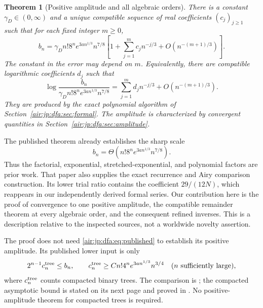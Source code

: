 \documentclass[11pt,letterpaper]{article}
\numberwithin{equation}{section}
\newtheorem{theorem}{Theorem}[section]
\theoremstyle{remark}
\begin{document}
\begin{theorem}[Positive amplitude and all algebraic orders]\label{air:jp:dfa:thm:main}
There is a constant $\gamma_D\in(0,\infty)$ and a unique compatible sequence of real coefficients $(c_j)_{j\ge1}$ such that for each fixed integer $m\ge0$,
\begin{equation}\label{air:jp:dfa:eq:main}
 b_n=\gamma_D n!8^ne^{3an^{1/3}}n^{7/8}
 \left[1+\sum_{j=1}^{m}c_jn^{-j/3}+O(n^{-(m+1)/3})\right].
\end{equation}
The constant in the error may depend on $m$. Equivalently, there are compatible logarithmic coefficients $d_j$ such that
\begin{equation}\label{air:jp:dfa:eq:logmain}
 \log\frac{b_n}{\gamma_D n!8^ne^{3an^{1/3}}n^{7/8}}
 =\sum_{j=1}^{m}d_jn^{-j/3}+O(n^{-(m+1)/3}).
\end{equation}
They are produced by the exact polynomial algorithm of Section~\ref{air:jp:dfa:sec:formal}. The amplitude is characterized by convergent quantities in Section~\ref{air:jp:dfa:sec:amplitude}.
\end{theorem}

The published theorem \cite[Theorem 1]{dfa} already establishes the sharp scale
\begin{equation}\label{air:jp:dfa:eq:published}
 b_n=\Theta\!\left(n!8^ne^{3an^{1/3}}n^{7/8}\right).
\end{equation}
Thus the factorial, exponential, stretched-exponential, and polynomial factors are prior work. That paper also supplies the exact recurrence and Airy comparison construction. Its lower trial ratio contains the coefficient $29/(12N)$, which reappears in our independently derived formal series. Our contribution here is the proof of convergence to one positive amplitude, the compatible remainder theorem at every algebraic order, and the consequent refined inverses. This is a description relative to the inspected sources, not a worldwide novelty assertion.

The proof does not need \eqref{air:jp:dfa:eq:published} to establish its positive amplitude. Its published lower input is only
\begin{equation}\label{air:jp:dfa:eq:compactedlower}
 2^{n-1}c_n^{\rm tree}\le b_n,\qquad
 c_n^{\rm tree}\ge C n!4^ne^{3an^{1/3}}n^{3/4}
 \quad(n\text{ sufficiently large}),
\end{equation}
where $c_n^{\rm tree}$ counts compacted binary trees. The comparison is \cite[Equation (1)]{dfa}; the compacted asymptotic bound is stated on its next page and proved in \cite{epfw}. No positive-amplitude theorem for compacted trees is required.
\end{document}
